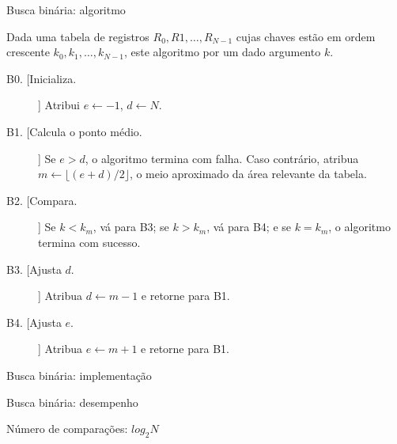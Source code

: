 \begin{frame}{Busca binária: algoritmo}


  Dada uma tabela de registros $R_0, R1, \ldots, R_{N-1}$ cujas chaves estão
  em ordem crescente $k_0, k_1, \ldots, k_{N-1}$, este algoritmo por um dado
  argumento $k$.

  \begin{description}
  \item[B0. [Inicializa.]] Atribui $e\leftarrow -1$, $d\leftarrow N$.
  \item[B1. [Calcula o ponto médio.]] Se $e>d$, o algoritmo termina
    com \alert{falha}. Caso contrário, atribua
    $m\leftarrow\lfloor(e+d)/2\rfloor$, o meio aproximado da área
    relevante da tabela.
  \item[B2. [Compara.]] Se $k<k_m$, vá para \alert{B3}; se $k>k_m$, vá
    para \alert{B4}; e se $k=k_m$, o algoritmo termina com \alert{sucesso}.
  \item[B3. [Ajusta $d$.]] Atribua $d\leftarrow m-1$ e retorne para \alert{B1}.
  \item[B4. [Ajusta $e$.]] Atribua $e\leftarrow m+1$ e retorne para \alert{B1}.
  \end{description}

\end{frame}


\begin{frame}[fragile]{Busca binária: implementação}


  

\end{frame}


\begin{frame}{Busca binária: desempenho}


  {\Large Número de comparações: $log_2N$}

\end{frame}







